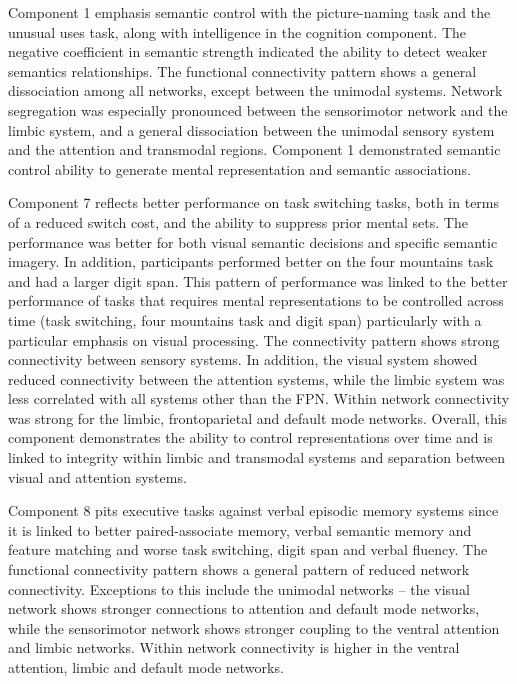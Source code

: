 Component 1 emphasis semantic control with the picture-naming task and the unusual uses task, along with intelligence in the cognition component. The negative coefficient in semantic strength indicated the ability to detect weaker semantics relationships. The functional connectivity pattern shows a general dissociation among all networks, except between the unimodal systems. Network segregation was especially pronounced between the sensorimotor network and the limbic system, and a general dissociation between the unimodal sensory system and the attention and transmodal regions. Component 1 demonstrated semantic control ability to generate mental representation and semantic associations. 

Component 7 reflects better performance on task switching tasks, both in terms of a reduced switch cost, and the ability to suppress prior mental sets. The performance was better for both visual semantic decisions and specific semantic imagery. In addition, participants performed better on the four mountains task and had a larger digit span. This pattern of performance was linked to the better performance of tasks that requires mental representations to be controlled across time (task switching, four mountains task and digit span) particularly with a particular emphasis on visual processing. The connectivity pattern shows strong connectivity between sensory systems. In addition, the visual system showed reduced connectivity between the attention systems, while the limbic system was less correlated with all systems other than the FPN. Within network connectivity was strong for the limbic, frontoparietal and default mode networks. Overall, this component demonstrates the ability to control representations over time and is linked to integrity within limbic and transmodal systems and separation between visual and attention systems.

Component 8 pits executive tasks against verbal episodic memory systems since it is linked to better paired-associate memory, verbal semantic memory and feature matching and worse task switching, digit span and verbal fluency. The functional connectivity pattern shows a general pattern of reduced network connectivity.  Exceptions to this include the unimodal networks – the visual network shows stronger connections to attention and default mode networks, while the sensorimotor network shows stronger coupling to the ventral attention and limbic networks. Within network connectivity is higher in the ventral attention, limbic and default mode networks. 

